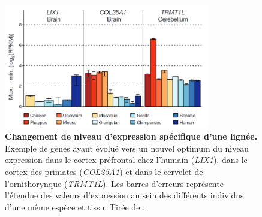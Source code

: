 \begin{figure}[h]
 \centering
 \includegraphics[width=0.8\textwidth, page=1] {figures/introduction/fig27.png}
 \caption[Changement de niveau d'expression spécifique d'une lignée.]{
 \textbf{Changement de niveau d'expression spécifique d'une lignée.}
 Exemple de gènes ayant évolué vers un nouvel optimum du niveau expression dans le cortex préfrontal chez l'humain (\textit{LIX1}), dans le cortex des primates (\textit{COL25A1}) et dans le cervelet de l'ornithorynque (\textit{TRMT1L}). Les barres d'erreurs représente l'étendue des valeurs d'expression au sein des différents individus d'une même espèce et tissu. Tirée de \citet{brawand_evolution_2011}.\\
 }
 \label{fig:Fig27}
\end{figure}


